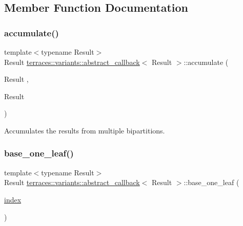 \subsection{Member Function Documentation}
\mbox{\label{classterraces_1_1variants_1_1abstract__callback_a3023a9a366af9fd5fdd5d6ad26137dc7}} 
\subsubsection{\texorpdfstring{accumulate()}{accumulate()}}
{\footnotesize\ttfamily template$<$typename Result$>$ \\
Result \hyperlink{classterraces_1_1variants_1_1abstract__callback}{terraces\+::variants\+::abstract\+\_\+callback}$<$ Result $>$\+::accumulate (\begin{DoxyParamCaption}\item[{Result}]{,  }\item[{Result}]{ }\end{DoxyParamCaption})}

Accumulates the results from multiple bipartitions. \mbox{\label{classterraces_1_1variants_1_1abstract__callback_a0f548b968a4027953c57378d33938026}} 
\subsubsection{\texorpdfstring{base\+\_\+one\+\_\+leaf()}{base\_one\_leaf()}}
{\footnotesize\ttfamily template$<$typename Result$>$ \\
Result \hyperlink{classterraces_1_1variants_1_1abstract__callback}{terraces\+::variants\+::abstract\+\_\+callback}$<$ Result $>$\+::base\+\_\+one\+\_\+leaf (\begin{DoxyParamCaption}\item[{\hyperlink{namespaceterraces_adbc33ccb543d1634e96d0eb02e472c77}{index}}]{ }\end{DoxyParamCaption})}


